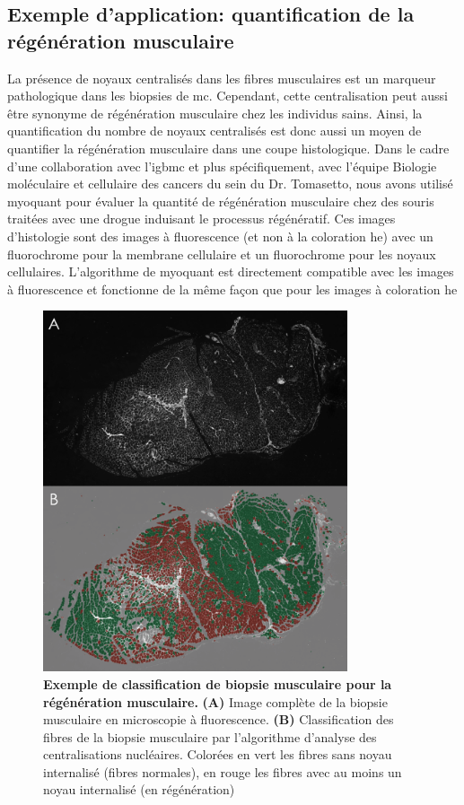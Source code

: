 \subsection{Exemple d'application: quantification de la régénération musculaire }
La présence de noyaux centralisés dans les fibres musculaires est un marqueur pathologique dans les biopsies de \gls{mc}. Cependant, cette centralisation peut aussi être synonyme de régénération musculaire chez les individus sains. Ainsi, la quantification du nombre de noyaux centralisés est donc aussi un moyen de quantifier la régénération musculaire dans une coupe histologique. Dans le cadre d'une collaboration avec l'\gls{igbmc} et plus spécifiquement, avec l'équipe Biologie moléculaire et cellulaire des cancers du sein du Dr. Tomasetto, nous avons utilisé \gls{myoquant} pour évaluer la quantité de régénération musculaire chez des souris traitées avec une drogue induisant le processus régénératif. Ces images d'histologie sont des images à fluorescence (et non à la coloration \gls{he}) avec un fluorochrome pour la membrane cellulaire et un fluorochrome pour les noyaux cellulaires. L'algorithme de \gls{myoquant} est directement compatible avec les images à fluorescence et fonctionne de la même façon que pour les images à coloration \gls{he}
\begin{figure}[!htbp]
 \centering
 \includegraphics[width=0.8\textwidth]{figures/fluo_nuc.png}
 \caption[Exemple de classification de biopsie musculaire pour la régénération musculaire]{\textbf{Exemple de classification de biopsie musculaire pour la régénération musculaire.} \textbf{(A)} Image complète de la biopsie musculaire en microscopie à fluorescence.\textbf{ (B)} Classification des fibres de la biopsie musculaire par l'algorithme d'analyse des centralisations nucléaires. Colorées en vert les fibres sans noyau internalisé (fibres normales), en rouge les fibres avec au moins un noyau internalisé (en régénération)}
 \label{fig:fluo_paint}
\end{figure}

